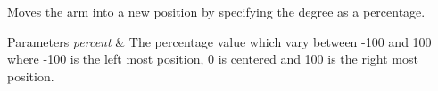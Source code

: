 Moves the arm into a new position by specifying the degree as a percentage. 


\begin{DoxyParams}{Parameters}
{\em percent} & The percentage value which vary between -\/100 and 100 where -\/100 is the left most position, 0 is centered and 100 is the right most position. \\
\hline
\end{DoxyParams}
